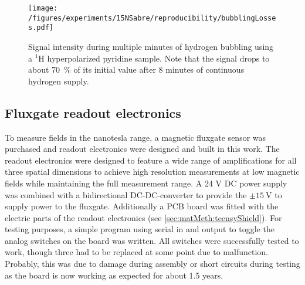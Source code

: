             \begin{figure}
                \centering
                \texttt{[image: /figures/experiments/15NSabre/reproducibility/bubblingLosses.pdf]}
                \caption[Bubbling fluid losses]{Signal intensity during multiple minutes of hydrogen bubbling using a $^{1}$H hyperpolarized pyridine sample. Note that the signal drops to about \SI{70}{\percent} of its initial value after 8 minutes of continuous hydrogen supply.}
                \label{fig:results:15N:shuttlingReproducibility}
            \end{figure}
    \subsection{Fluxgate readout electronics}
    To measure fields in the nanotesla range, a magnetic fluxgate sensor was purchased and readout electronics were designed and built in this work. The readout electronics were designed to feature a wide range of amplifications for all three spatial dimensions to achieve high resolution measurements at low magnetic fields while maintaining the full measurement range. A 24 V DC power supply was combined  with a bidirectional DC-DC-converter to provide the $\pm\SI{15}{\volt}$ to supply power to the fluxgate. Additionally a PCB board was fitted with the electric parts of the readout electronics (see \ref{sec:matMeth:teensyShield}). For testing purposes, a simple program using serial in and output to toggle the analog switches on the board was written. All switches were successfully tested to work, though three had to be replaced at some point due to malfunction. Probably, this was due to damage during assembly or short circuits during testing as the board is now working as expected for about 1.5 years.
